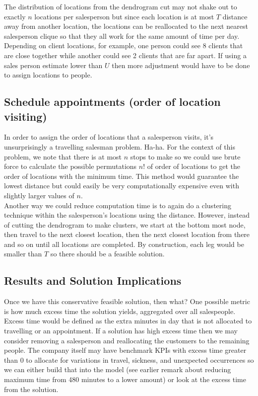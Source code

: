 \documentclass{article}
\begin{document}
The distribution of locations from the dendrogram cut may not shake out to exactly $n$ locations per salesperson but since each location is at most $T$ distance away from another location, the locations can be reallocated to the next nearest salesperson clique so that they all work for the same amount of time per day.  Depending on client locations, for example, one person could see 8 clients that are close together while another could see 2 clients that are far apart.  If using a sales person estimate lower than $U$ then more adjustment would have to be done to assign locations to people.\\

\subsection{Schedule appointments (order of location visiting)}
In order to assign the order of locations that a salesperson visits, it's unsurprisingly a travelling salesman problem. Ha-ha. For the context of this problem, we note that there is at most $n$ stops to make so we could use brute force to calculate the possible permutations $n!$ of order of locations to get the order of locations with the minimum time. This method would guarantee the lowest distance but could easily be very computationally expensive even with slightly larger values of $n$.\\

Another way we could reduce computation time is to again do a clustering technique within the salesperson's locations using the distance.  However, instead of cutting the dendrogram to make clusters, we start at the bottom most node, then travel to the next closest location, then the next closest location from there and so on until all locations are completed.  By construction, each leg would be smaller than $T$ so there should be a feasible solution.\\

\subsection{Results and Solution Implications}
Once we have this conservative feasible solution, then what? One possible metric is how much excess time the solution yields, aggregated over all salespeople.  Excess time would be defined as the extra minutes in day that is not allocated to travelling or an appointment.  If a solution has high excess time then we may consider removing a salesperson and reallocating the customers to the remaining people.  The company itself may have benchmark KPIs with excess time greater than 0 to allocate for variations in travel, sickness, and unexpected occurrences so we can either build that into the model (see earlier remark about reducing maximum time from 480 minutes to a lower amount) or look at the excess time from the solution.\\
\end{document}
